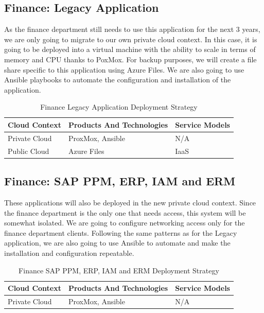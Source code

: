 \documentclass{llncs}
\begin{document}
\subsection{Finance: Legacy Application}

As the finance department still needs to use this application for the next 3 years, we are only going to migrate to our own private cloud context.
In this case, it is going to be deployed into a virtual machine with the ability to scale in terms of memory and CPU thanks to PoxMox.
For backup purposes, we will create a file share specific to this application using Azure Files.
We are also going to use Ansible playbooks to automate the configuration and installation of the application.\\

\begin{table}[h!]
    \centering
    \begin{tabular}{lll}
        \hline
        \textbf{Cloud Context} & \textbf{Products And Technologies} & \textbf{Service Models} \\
        \hline
        Private Cloud          & ProxMox, Ansible                   & N/A                     \\
        \hline
        Public Cloud           & Azure Files                        & IaaS                    \\
        \hline
    \end{tabular}
    \caption{Finance Legacy Application Deployment Strategy}
\end{table}


\subsection{Finance: SAP PPM, ERP, IAM and ERM}
These applications will also be deployed in the new private cloud context.
Since the finance department is the only one that needs access, this system will be somewhat isolated.
We are going to configure networking access only for the finance department clients.
Following the same patterns as for the Legacy application, we are also going to use Ansible to automate and make the installation and configuration repeatable.\\


\begin{table}[h!]
    \centering
    \begin{tabular}{lll}
        \hline
        \textbf{Cloud Context} & \textbf{Products And Technologies} & \textbf{Service Models} \\
        \hline
        Private Cloud          & ProxMox, Ansible                   & N/A                     \\
        \hline
    \end{tabular}
    \caption{Finance SAP PPM, ERP, IAM and ERM Deployment Strategy}
\end{table}
\end{document}
